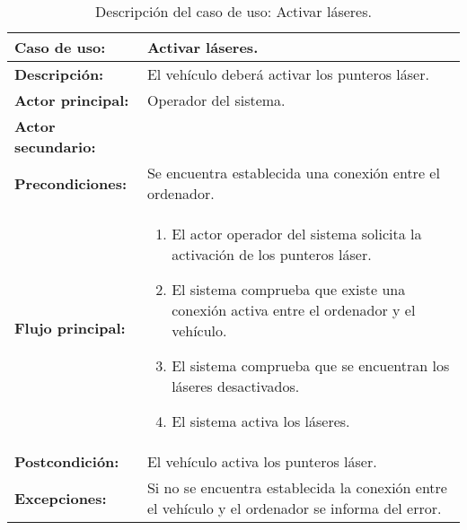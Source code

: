 \begin{table}[H]
  \begin{center}
    \begin{tabular}{|p{3.5cm}|p{10cm}|}
      \hline
      {\textbf{Caso de uso:}} & { Activar láseres.} \\
      \hline
      {\textbf{Descripción:}} & {El vehículo deberá activar los punteros láser.} \\
     \hline
      {\textbf{Actor principal:}} & { Operador del sistema.} \\
      \hline
      {\textbf{Actor secundario:}} & {}\\
      \hline
      {\textbf{Precondiciones:}} & { Se encuentra establecida una conexión entre el ordenador.} \\
     \hline 
     {\textbf{Flujo principal:}} & { 
       \begin{enumerate}
       \item El actor operador del sistema solicita la activación de los punteros láser.
       \item El sistema comprueba que existe una conexión activa entre el ordenador y el vehículo.
       \item El sistema comprueba que se encuentran los láseres desactivados.
       \item El sistema activa los láseres.
       \end{enumerate}
     } \\
     \hline
     {\textbf{Postcondición:}} & { El vehículo activa los punteros láser.}\\
     \hline
     {\textbf{Excepciones:}} & {Si no se encuentra establecida la conexión entre el vehículo y el ordenador se informa del error.}\\        
     \hline
    \end{tabular}
  \end{center}
\caption{Descripción del caso de uso: Activar láseres.}
\end{table}


